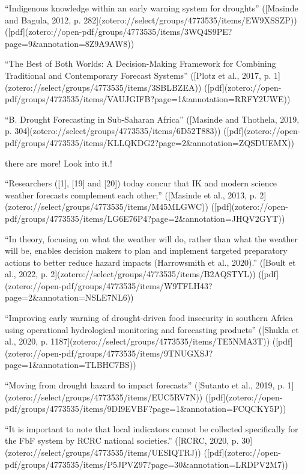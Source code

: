 {“Indigenous knowledge within an early warning system for droughts” ([Masinde and Bagula, 2012, p. 282](zotero://select/groups/4773535/items/EW9XSSZP)) ([pdf](zotero://open-pdf/groups/4773535/items/3WQ4S9PE?page=9&annotation=8Z9A9AW8))

“The Best of Both Worlds: A Decision-Making Framework for Combining Traditional and Contemporary Forecast Systems” ([Plotz et al., 2017, p. 1](zotero://select/groups/4773535/items/3SBLBZEA)) ([pdf](zotero://open-pdf/groups/4773535/items/VAUJGIFB?page=1&annotation=RRFY2UWE))

“B. Drought Forecasting in Sub-Saharan Africa” ([Masinde and Thothela, 2019, p. 304](zotero://select/groups/4773535/items/6D52T883)) ([pdf](zotero://open-pdf/groups/4773535/items/KLLQKDG2?page=2&annotation=ZQSDUEMX))

there are more! Look into it.!

“Researchers ([1], [19] and [20]) today concur that IK and modern science weather forecasts complement each other;” ([Masinde et al., 2013, p. 2](zotero://select/groups/4773535/items/M45MLGWC)) ([pdf](zotero://open-pdf/groups/4773535/items/LG6E76P4?page=2&annotation=JHQV2GYT))


“In theory, focusing on what the weather will do, rather than what the weather will be, enables decision makers to plan and implement targeted preparatory actions to better reduce hazard impacts (Harrowsmith et al., 2020).” ([Boult et al., 2022, p. 2](zotero://select/groups/4773535/items/B2AQSTYL)) ([pdf](zotero://open-pdf/groups/4773535/items/W9TFLH43?page=2&annotation=NSLE7NL6))

“Improving early warning of drought-driven food insecurity in southern Africa using operational hydrological monitoring and forecasting products” ([Shukla et al., 2020, p. 1187](zotero://select/groups/4773535/items/TE5NMA3T)) ([pdf](zotero://open-pdf/groups/4773535/items/9TNUGXSJ?page=1&annotation=TLBHC7BS))

“Moving from drought hazard to impact forecasts” ([Sutanto et al., 2019, p. 1](zotero://select/groups/4773535/items/EUC5RV7N)) ([pdf](zotero://open-pdf/groups/4773535/items/9DI9EVBF?page=1&annotation=FCQCKY5P))



“It is important to note that local indicators cannot be collected specifically for the FbF system by RCRC national societies.” ([RCRC, 2020, p. 30](zotero://select/groups/4773535/items/UESIQTRJ)) ([pdf](zotero://open-pdf/groups/4773535/items/P5JPVZ97?page=30&annotation=LRDPV2M7))

}
